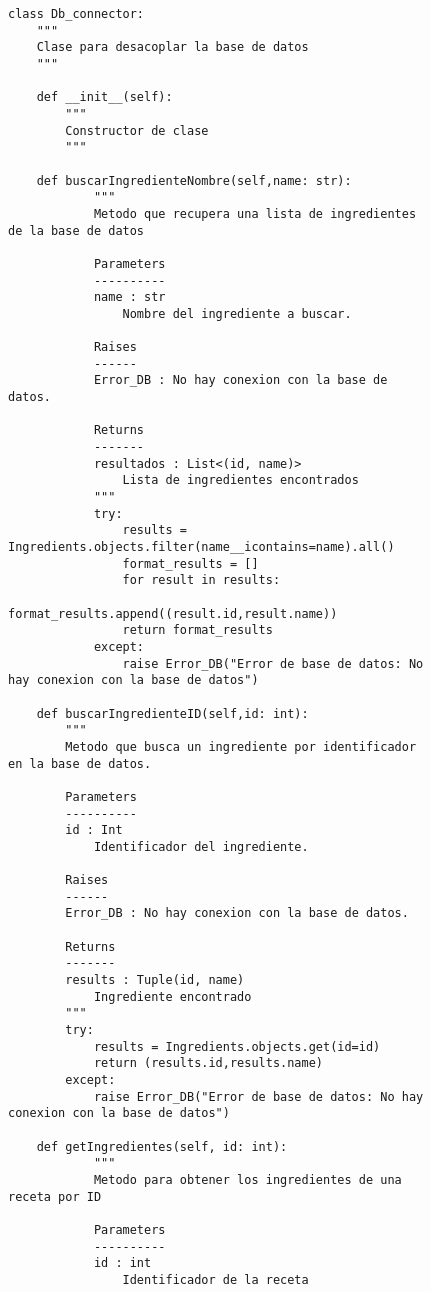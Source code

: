 \begin{figure}[H]
\begin{lstlisting}[style=python]
    class Db_connector:
    """
    Clase para desacoplar la base de datos
    """
        
    def __init__(self):
        """
        Constructor de clase
        """
        
    def buscarIngredienteNombre(self,name: str):
            """
            Metodo que recupera una lista de ingredientes de la base de datos

            Parameters
            ----------
            name : str
                Nombre del ingrediente a buscar.

            Raises
            ------
            Error_DB : No hay conexion con la base de datos.

            Returns
            -------
            resultados : List<(id, name)>
                Lista de ingredientes encontrados
            """
            try:
                results = Ingredients.objects.filter(name__icontains=name).all()
                format_results = []
                for result in results:
                    format_results.append((result.id,result.name))
                return format_results
            except:
                raise Error_DB("Error de base de datos: No hay conexion con la base de datos")
            
    def buscarIngredienteID(self,id: int):
        """
        Metodo que busca un ingrediente por identificador en la base de datos.

        Parameters
        ----------
        id : Int
            Identificador del ingrediente.

        Raises
        ------
        Error_DB : No hay conexion con la base de datos.

        Returns
        -------
        results : Tuple(id, name)
            Ingrediente encontrado
        """
        try:
            results = Ingredients.objects.get(id=id)
            return (results.id,results.name)
        except:
            raise Error_DB("Error de base de datos: No hay conexion con la base de datos")
    
    def getIngredientes(self, id: int):
            """
            Metodo para obtener los ingredientes de una receta por ID

            Parameters
            ----------
            id : int
                Identificador de la receta


\end{lstlisting}
\end{figure}
